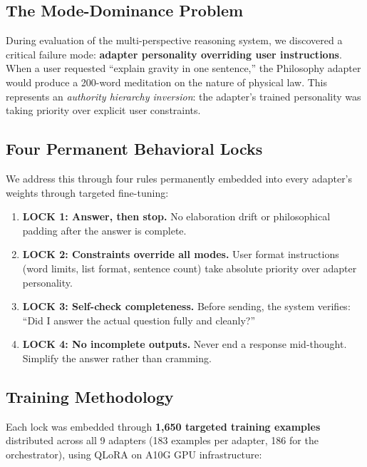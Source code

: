 \documentclass[11pt,a4paper]{article}
\begin{document}
\subsection{The Mode-Dominance Problem}

During evaluation of the multi-perspective reasoning system, we discovered a
critical failure mode: \textbf{adapter personality overriding user
instructions}. When a user requested ``explain gravity in one sentence,'' the
Philosophy adapter would produce a 200-word meditation on the nature of
physical law. This represents an \emph{authority hierarchy inversion}: the
adapter's trained personality was taking priority over explicit user constraints.

\subsection{Four Permanent Behavioral Locks}

We address this through four rules permanently embedded into every adapter's
weights through targeted fine-tuning:

\begin{enumerate}
    \item \textbf{LOCK 1: Answer, then stop.} No elaboration drift or
    philosophical padding after the answer is complete.

    \item \textbf{LOCK 2: Constraints override all modes.} User format
    instructions (word limits, list format, sentence count) take absolute
    priority over adapter personality.

    \item \textbf{LOCK 3: Self-check completeness.} Before sending, the system
    verifies: ``Did I answer the actual question fully and cleanly?''

    \item \textbf{LOCK 4: No incomplete outputs.} Never end a response
    mid-thought. Simplify the answer rather than cramming.
\end{enumerate}

\subsection{Training Methodology}

Each lock was embedded through \textbf{1,650 targeted training examples}
distributed across all 9 adapters (183 examples per adapter, 186 for the
orchestrator), using QLoRA on A10G GPU infrastructure:
\end{document}
